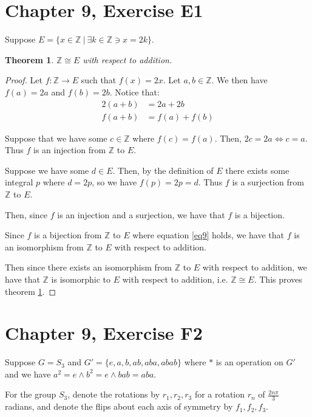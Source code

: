 \documentclass[12pt]{article}
\newcommand{\ints}{\mathbb{Z}}
\newtheorem{thm}{Theorem}
\begin{document}
\section{Chapter 9, Exercise E1}

Suppose $E = \{ x \in \ints\ |\ \exists k \in \ints \ni x = 2k \}$.

\begin{thm} \label{thm3}
	$\ints \cong E$ with respect to addition.
\end{thm}

\begin{proof}
	Let $f:\ints \to E$ such that $f(x) = 2x$.
	Let $a,b \in \ints$.
	We then have $f(a) = 2a$ and $f(b) = 2b$.
	Notice that:
	\begin{align}
		2(a + b) & = 2a + 2b \\
		\label{eq9}
		f(a + b) & = f(a) + f(b)
	\end{align}

	Suppose that we have some $c \in \ints$
	where $f(c) = f(a)$.
	Then, $2c = 2a \iff c = a$.
	Thus $f$ is an injection from $\ints$ to $E$.

	Suppose we have some $d \in E$.
	Then, by the definition of $E$
	there exists some integral $p$
	where $d = 2p$,
	so we have $f(p) = 2p = d$.
	Thus $f$ is a surjection from $\ints$ to $E$.

	Then, since $f$ is
	an injection and a surjection,
	we have that $f$ is a bijection.

	Since $f$ is a bijection from
	$\ints$ to $E$ where equation \ref{eq9} holds,
	we have that $f$ is an
	isomorphism from $\ints$ to $E$
	with respect to addition.

	Then since there exists an isomorphism from
	$\ints$ to $E$ with respect to addition,
	we have that $\ints$ is isomorphic to $E$
	with respect to addition,
	i.e. $\ints \cong E$.
	This proves theorem \ref{thm3}.
\end{proof}

\section{Chapter 9, Exercise F2} \label{permsect}

Suppose $G = S_3$ and $G' = \{e, a, b, ab, aba, abab \}$
where $*$ is an operation on $G'$ and we have
$a^2 = e \land b^2 = e \land bab = aba$.

For the group $S_3$,
denote the rotations by $r_1, r_2, r_3$ for a rotation $r_n$ of $\frac{2 n\pi}{3}$ radians,
and denote the flips about each axis of symmetry by $f_1, f_2, f_3$.
\end{document}

